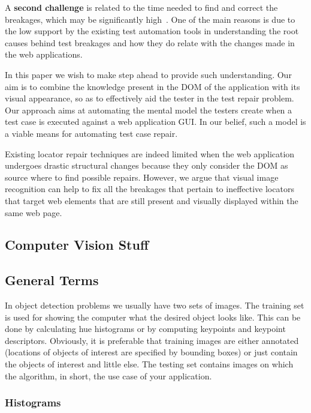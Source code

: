 A \textbf{second challenge} is related to the time needed to find and correct the breakages, which may be significantly high~\cite{Leotta-TAIC-2013,JAMAICA2013}. One of the main reasons is due to the low support by the existing test automation tools in understanding the root causes behind test breakages and how they do relate with the changes made in the web applications. 

In this paper we wish to make step ahead to provide such understanding. 
Our aim is to combine the knowledge present in the DOM of the application with its visual appearance, so as to effectively aid the tester in the test repair problem. Our approach aims at automating the mental model the testers create when a test case is executed against a web application GUI. In our belief, such a model is a viable means for automating test case repair.

Existing locator repair techniques are indeed limited when the web application undergoes drastic structural changes because they only consider the DOM as source where to find possible repairs.
However, we argue that visual image recognition can help to fix all the breakages that pertain to ineffective locators that target web elements that are still present and visually displayed within the same web page.

\subsection{Computer Vision Stuff}

\subsection{General Terms}

In object detection problems we usually have two sets of images. The training set is used for showing the computer what the desired object looks like. This can be done by calculating hue histograms or by computing keypoints and keypoint descriptors. Obviously, it is preferable that training images are either annotated (locations of objects of interest are specified by bounding boxes) or just contain the objects of interest and little else. The testing set contains images on which the algorithm, in short, the use case of your application.

\subsubsection{Histograms}

